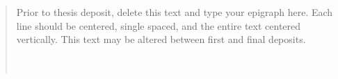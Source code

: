 \vspace*{\fill} 
\begin{quote}
\centering
Prior to thesis deposit, delete this text and type your epigraph here.  Each line should be centered, single spaced, and the entire text centered vertically.  This text may be altered between first and final deposits.\\
\mylinespacing
\myname \\
\mytitle \\
\mylinespacing
\myoptpg
\end{quote}
\vspace*{\fill}